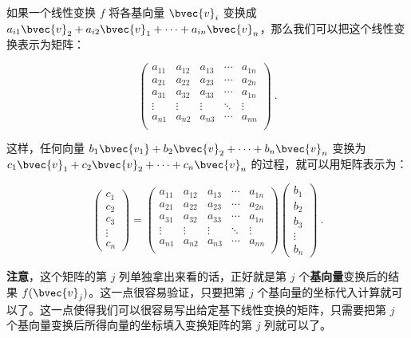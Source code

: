 如果一个线性变换 $f$ 将各基向量 $\bvec{v}_i$ 变换成 $a_{i1}\bvec{v}_2+a_{i2}\bvec{v}_1+\cdots+a_{in}\bvec{v}_n$，那么我们可以把这个线性变换表示为矩阵：

\begin{equation}
    \begin{pmatrix}
    a_{11}&a_{12}&a_{13}&\cdots&a_{1n}\\
    a_{21}&a_{22}&a_{23}&\cdots&a_{2n}\\
    a_{31}&a_{32}&a_{33}&\cdots&a_{1n}\\
    \vdots&\vdots&\vdots&\ddots&\vdots\\
    a_{n1}&a_{n2}&a_{n3}&\cdots&a_{nn}\\
    \end{pmatrix}~.
\end{equation}

这样，任何向量 $b_1\bvec{v_1}+b_2\bvec{v}_2+\cdots+b_n\bvec{v}_n$ 变换为 $c_1\bvec{v}_1+c_2\bvec{v}_2+\cdots+c_n\bvec{v}_n$ 的过程，就可以用矩阵表示为：

\begin{equation}
\begin{pmatrix}
c_1\\c_2\\c_3\\\vdots\\c_n
\end{pmatrix}
=
    \begin{pmatrix}
    a_{11}&a_{12}&a_{13}&\cdots&a_{1n}\\
    a_{21}&a_{22}&a_{23}&\cdots&a_{2n}\\
    a_{31}&a_{32}&a_{33}&\cdots&a_{1n}\\
    \vdots&\vdots&\vdots&\ddots&\vdots\\
    a_{n1}&a_{n2}&a_{n3}&\cdots&a_{nn}\\
    \end{pmatrix}
    \begin{pmatrix}
    b_1\\b_2\\b_3\\\vdots\\b_n
    \end{pmatrix}~.
\end{equation}

\textbf{注意}，这个矩阵的第 $j$ 列单独拿出来看的话，正好就是第 $j$ 个\textbf{基向量}变换后的结果 $f(\bvec{v}_j)$。这一点很容易验证，只要把第 $j$ 个基向量的坐标代入计算就可以了。这一点使得我们可以很容易写出给定基下线性变换的矩阵，只需要把第 $j$ 个基向量变换后所得向量的坐标填入变换矩阵的第 $j$ 列就可以了。

